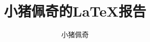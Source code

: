 \documentclass[12pt,a4paper]{article}
\title{小猪佩奇的\LaTeX 报告}
\author{小猪佩奇}
\newcommand{\clearpagestyle}[0]{\thispagestyle{empty}}
\begin{document}
\large

\begin{titlepage}
    \maketitle\clearpagestyle
    \newpage{}\tableofcontents
    \newpage{}
\end{titlepage}




\end{document}
